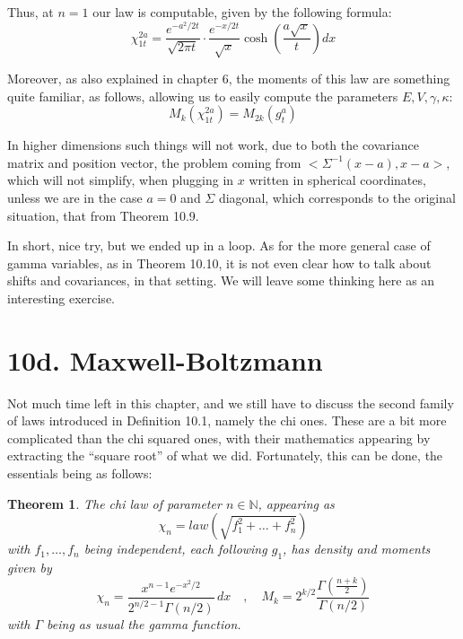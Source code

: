 \documentclass[12pt]{amsbook}
\newtheorem{theorem}{Theorem}[chapter]
\begin{document}
Thus, at $n=1$ our law is computable, given by the following formula:
$$\chi^{2a}_{1t}=\frac{e^{-a^2/2t}}{\sqrt{2\pi t}}\cdot\frac{e^{-x/2t}}{\sqrt{x}}\cosh\left(\frac{a\sqrt{x}}{t}\right)dx$$

Moreover, as also explained in chapter 6, the moments of this law are something quite familiar, as follows, allowing us to easily compute the parameters $E,V,\gamma,\kappa$:
$$M_k(\chi^{2a}_{1t})=M_{2k}(g_t^a)$$

In higher dimensions such things will not work, due to both the covariance matrix and position vector, the problem coming from $<\Sigma^{-1}(x-a),x-a>$, which will not simplify, when plugging in $x$ written in spherical coordinates, unless we are in the case $a=0$ and $\Sigma$ diagonal, which corresponds to the original situation, that from Theorem 10.9.

\bigskip

In short, nice try, but we ended up in a loop. As for the more general case of gamma variables, as in Theorem 10.10, it is not even clear how to talk about shifts and covariances, in that setting. We will leave some thinking here as an interesting exercise.

\section*{10d. Maxwell-Boltzmann}

Not much time left in this chapter, and we still have to discuss the second family of laws introduced in Definition 10.1, namely the chi ones. These are a bit more complicated than the chi squared ones, with their mathematics appearing by extracting the ``square root'' of what we did. Fortunately, this can be done, the essentials being as follows:

\begin{theorem}
The chi law of parameter $n\in\mathbb N$, appearing as
$$\chi_n=law\left(\sqrt{f_1^2+\ldots+f_n^2}\right)$$
with $f_1,\ldots,f_n$ being independent, each following $g_1$, has density and moments given by
$$\chi_n=\frac{x^{n-1}e^{-x^2/2}}{2^{n/2-1}\Gamma(n/2)}\,dx\quad,\quad 
M_k=2^{k/2}\frac{\Gamma\left(\frac{n+k}{2}\right)}{\Gamma(n/2)}$$
with $\Gamma$ being as usual the gamma function.
\end{theorem}
\end{document}

